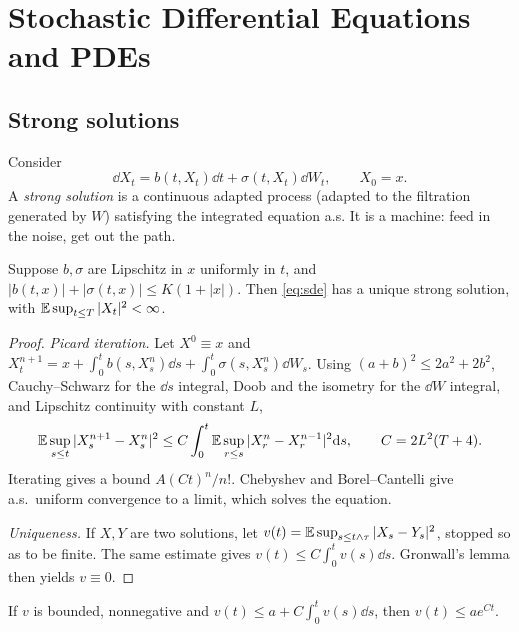 \chapter{Stochastic Differential Equations and PDEs}\label{ch:sde}

\section{Strong solutions}

Consider
\begin{equation}\label{eq:sde}
\dd X_t=b(t,X_t)\dd t+\sigma(t,X_t)\dd W_t,\qquad X_0=x.
\end{equation}
A \emph{strong solution} is a continuous adapted process (adapted to the filtration generated by $W$) satisfying the integrated equation a.s. It is a machine: feed in the noise, get out the path.

\begin{theorem}\label{thm:sdeexist}
Suppose $b,\sigma$ are Lipschitz in $x$ uniformly in $t$, and $|b(t,x)|+|\sigma(t,x)|\le K(1+|x|)$. Then \eqref{eq:sde} has a unique strong solution, with $\mathbb{E}\sup_{t\le T}|X_t|^2<\infty$.
\end{theorem}
\begin{proof}
\emph{Picard iteration.} Let $X^0\equiv x$ and $X^{n+1}_t=x+\int_0^tb(s,X^n_s)\dd s+\int_0^t\sigma(s,X^n_s)\dd W_s$. Using $(a+b)^2\le2a^2+2b^2$, Cauchy--Schwarz for the $\dd s$ integral, Doob and the isometry for the $\dd W$ integral, and Lipschitz continuity with constant $L$,
\[
\mathbb{E}\sup_{s\le t}|X^{n+1}_s-X^n_s|^2\le C\int_0^t\mathbb{E}\sup_{r\le s}|X^n_r-X^{n-1}_r|^2\mathrm{d} s,\qquad C=2L^2(T+4).
\]
Iterating gives a bound $A(Ct)^n/n!$. Chebyshev and Borel--Cantelli give a.s.\ uniform convergence to a limit, which solves the equation.

\emph{Uniqueness.} If $X,Y$ are two solutions, let $v(t)=\mathbb{E}\sup_{s\le t\wedge\tau}|X_s-Y_s|^2$, stopped so as to be finite. The same estimate gives $v(t)\le C\int_0^tv(s)\dd s$. Gronwall's lemma then yields $v\equiv0$.
\end{proof}

\begin{lemma}[Gronwall]
If $v$ is bounded, nonnegative and $v(t)\le a+C\int_0^tv(s)\dd s$, then $v(t)\le ae^{Ct}$.
\end{lemma}

